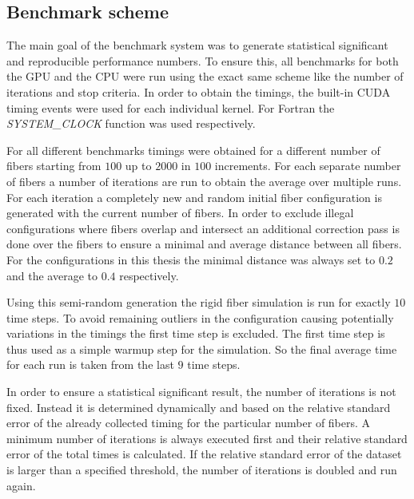 \documentclass[a4paper,11pt]{kth-mag}
\begin{document}
\subsection{Benchmark scheme}

The main goal of the benchmark system was to generate statistical significant and reproducible performance numbers. To ensure this, all benchmarks for both the GPU and the CPU were run using the exact same scheme like the number of iterations and stop criteria. In order to obtain the timings, the built-in CUDA timing events were used for each individual kernel. For Fortran the \emph{SYSTEM\_CLOCK} function was used respectively.

For all different benchmarks timings were obtained for a different number of fibers starting from $100$ up to $2000$ in $100$ increments. For each separate number of fibers a number of iterations are run to obtain the average over multiple runs. For each iteration a completely new and random initial fiber configuration is generated with the current number of fibers. In order to exclude illegal configurations where fibers overlap and intersect an additional correction pass is done over the fibers to ensure a minimal and average distance between all fibers. For the configurations in this thesis the minimal distance was always set to $0.2$ and the average to $0.4$ respectively.

Using this semi-random generation the rigid fiber simulation is run for exactly $10$ time steps. To avoid remaining outliers in the configuration causing potentially variations in the timings the first time step is excluded. The first time step is thus used as a simple warmup step for the simulation. So the final average time for each run is taken from the last $9$ time steps.

In order to ensure a statistical significant result, the number of iterations is not fixed. Instead it is determined dynamically and based on the relative standard error of the already collected timing for the particular number of fibers. A minimum number of iterations is always executed first and their relative standard error of the total times is calculated. If the relative standard error of the dataset is larger than a specified threshold, the number of iterations is doubled and run again.
\end{document}
